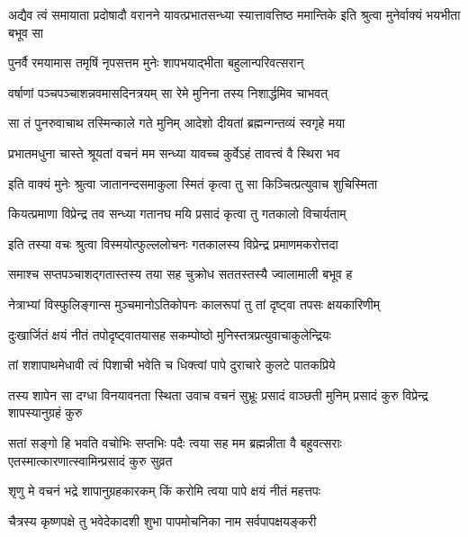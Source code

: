 
\threelineshloka
{अद्यैव त्वं समायाता प्रदोषादौ वरानने}
{यावत्प्रभातसन्ध्या स्यात्तावत्तिष्ठ ममान्तिके}
{इति श्रुत्वा मुनेर्वाक्यं भयभीता बभूव सा}%

\twolineshloka
{पुनर्वै रमयामास तमृषिं नृपसत्तम}
{मुनेः शापभयाद्भीता बहुलान्परिवत्सरान्}%

\twolineshloka
{वर्षाणां पञ्चपञ्चाशन्नवमासदिनत्रयम्}
{सा रेमे मुनिना तस्य निशार्द्धमिव चाभवत्}%

\twolineshloka
{सा तं पुनरुवाचाथ तस्मिन्काले गते मुनिम्}
{आदेशो दीयतां ब्रह्मन्गन्तव्यं स्वगृहे मया}%


\twolineshloka
{प्रभातमधुना चास्ते श्रूयतां वचनं मम}
{सन्ध्या यावच्च कुर्वेऽहं तावत्त्वं वै स्थिरा भव}%

\twolineshloka
{इति वाक्यं मुनेः श्रुत्वा जातानन्दसमाकुला}
{स्मितं कृत्वा तु सा किञ्चित्प्रत्युवाच शुचिस्मिता}%


\twolineshloka
{कियत्प्रमाणा विप्रेन्द्र तव सन्ध्या गतानघ}
{मयि प्रसादं कृत्वा तु गतकालो विचार्यताम्}%

\twolineshloka
{इति तस्या वचः श्रुत्वा विस्मयोत्फुल्ललोचनः}
{गतकालस्य विप्रेन्द्र प्रमाणमकरोत्तदा}%

\twolineshloka
{समाश्च सप्तपञ्चाशद्गतास्तस्य तया सह}
{चुक्रोध सततस्तस्यै ज्वालामाली बभूव ह}%

\twolineshloka
{नेत्राभ्यां विस्फुलिङ्गान्स मुञ्चमानोऽतिकोपनः}
{कालरूपां तु तां दृष्ट्वा तपसः क्षयकारिणीम्}%

\twolineshloka
{दुःखार्जितं क्षयं नीतं तपोदृष्ट्वातयासह}
{सकम्पोष्ठो मुनिस्तत्रप्रत्युवाचाकुलेन्द्रियः}%

\twolineshloka
{तां शशापाथमेधावी त्वं पिशाची भवेति च}
{धिक्त्वां पापे दुराचारे कुलटे पातकप्रिये}%

\threelineshloka
{तस्य शापेन सा दग्धा विनयावनता स्थिता}
{उवाच वचनं सुभ्रूः प्रसादं वाञ्छती मुनिम्}
{प्रसादं कुरु विप्रेन्द्र शापस्यानुग्रहं कुरु}%

\threelineshloka
{सतां सङ्गो हि भवति वचोभिः सप्तभिः पदैः}
{त्वया सह मम ब्रह्मन्नीता वै बहुवत्सराः}
{एतस्मात्कारणात्स्वामिन्प्रसादं कुरु सुव्रत}%


\twolineshloka
{शृणु मे वचनं भद्रे शापानुग्रहकारकम्}
{किं करोमि त्वया पापे क्षयं नीतं महत्तपः}%

\twolineshloka
{चैत्रस्य कृष्णपक्षे तु भवेदेकादशी शुभा}
{पापमोचनिका नाम सर्वपापक्षयङ्करी}%

